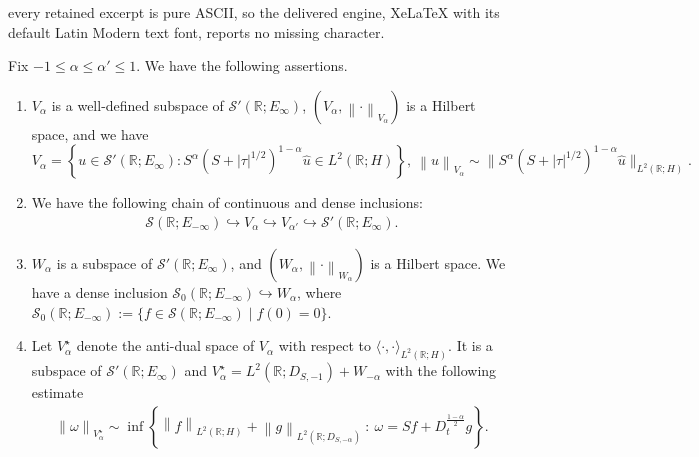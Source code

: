 \documentclass[10pt,a4paper]{amsart}
\begin{document}
every retained excerpt is pure ASCII, so the delivered engine, XeLaTeX with its default Latin Modern text font, reports no missing character.
\begin{lem}\label{Spaces V_alpha} Fix  $-1 \leq \alpha \leq \alpha' \leq 1$. We have the following assertions. 
\begin{enumerate}
        \item $V_\alpha $ is a well-defined  subspace of  $\mathcal{S'}(\mathbb{R};E_\infty)$, $\left ( V_\alpha, \left \| \cdot \right \|_{V_\alpha} \right )$ is a Hilbert space, and we have 
                 \begin{equation*}
                     V_\alpha = \left \{ u \in \mathcal{S'}(\mathbb{R};E_\infty) : S^\alpha (S+\left | \tau \right |^{1/2})^{1-\alpha} \hat{u} \in L^2(\mathbb{R};H)\right \}, \ \left \| u \right \|_{V_\alpha} \sim  \| S^\alpha (S+\left | \tau \right |^{1/2})^{1-\alpha}\hat{u}  \|_{L^2(\mathbb{R};H)}.
                 \end{equation*}
        \item We have the following chain of continuous and dense inclusions:
        \begin{align*}
            \mathcal{S}(\mathbb{R};E_{-\infty}) \hookrightarrow V_\alpha \hookrightarrow V_{\alpha'} \hookrightarrow \mathcal{S'}(\mathbb{R};E_{\infty}).
        \end{align*}
         \item { $W_\alpha$ is a subspace of $\mathcal{S'}(\mathbb{R}; E_\infty)$, and $\left( W_\alpha, \left\| \cdot \right\|_{W_\alpha} \right)$ is a Hilbert space. We have a dense inclusion $\mathcal{S}_0(\mathbb{R}; E_{-\infty}) \hookrightarrow W_\alpha$, where
$\mathcal{S}_0(\mathbb{R}; E_{-\infty}) := \{ f \in \mathcal{S}(\mathbb{R}; E_{-\infty}) \mid \hat{f}(0) = 0 \}. $}
        \item Let $V_\alpha^\star$ denote the anti-dual space of $V_\alpha$ with respect to $\langle \cdot , \cdot \rangle_{L^2(\mathbb{R};H)}$. It is a subspace of $\mathcal{S}'(\mathbb{R};E_\infty)$ and  $V_\alpha^\star = L^2(\mathbb{R};D_{S,-1}) + W_{-\alpha}$ with the following estimate
    \begin{align*}     
   \left \| \omega  \right \|_{V_\alpha^\star} \sim \inf  \left\{  \left \| f \right \|_{L^2(\mathbb{R};H)}+\left \| g \right \|_{L^2(\mathbb{R};D_{S,-\alpha})}  \ : \ {\omega=Sf+D_t^{\frac{1-\alpha}{2}}g}\right\}.
\end{align*}
         
    \end{enumerate}
\end{lem}
\end{document}
